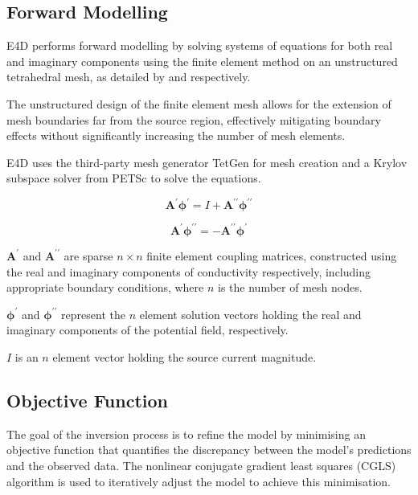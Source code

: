 \documentclass[a4paper,12pt]{article}
\begin{document}
\subsection{Forward Modelling}

E4D performs forward modelling by solving systems of equations for both real and imaginary components using the finite element method on an unstructured tetrahedral mesh, as detailed by \cite{johnson_3-d_2017} and \cite{rucker_three-dimensional_2006} respectively.

The unstructured design of the finite element mesh allows for the extension of mesh boundaries far from the source region, effectively mitigating boundary effects without significantly increasing the number of mesh elements.

E4D uses the third-party mesh generator TetGen \cite{10.1145/2629697} for mesh creation and a Krylov subspace solver from PETSc \cite{balay2019petsc} to solve the equations.

\begin{equation}
\mathbf{A}^\prime \boldsymbol {\phi}^\prime = I + \mathbf{A}^{\prime\prime}\boldsymbol {\phi}^{\prime\prime}
\end{equation}

\begin{equation}
\mathbf{A}^\prime \boldsymbol {\phi}^{\prime\prime} = -\mathbf{A}^{\prime\prime}\boldsymbol {\phi}^\prime
\end{equation}

$\mathbf{A}^\prime$ and $\mathbf{A}^{\prime\prime}$ are sparse $n \times n$ finite element coupling matrices, constructed using the real and imaginary components of conductivity respectively, including appropriate boundary conditions, where $n$ is the number of mesh nodes.

$\boldsymbol {\phi}^{\prime}$ and $\boldsymbol {\phi}^{\prime\prime}$ represent the $n$ element solution vectors holding the real and imaginary components of the potential field, respectively.

$I$ is an $n$ element vector holding the source current magnitude.

\subsection{Objective Function}

The goal of the inversion process is to refine the model by minimising an objective function that quantifies the discrepancy between the model's predictions and the observed data. The nonlinear conjugate gradient least squares (CGLS) algorithm is used to iteratively adjust the model to achieve this minimisation. 
\end{document}
